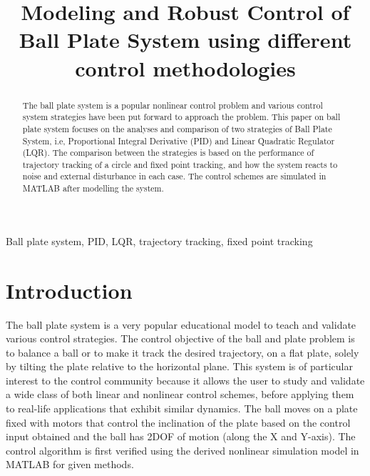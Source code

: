 \documentclass[conference]{IEEEtran}
\begin{document}
\title{Modeling and Robust Control of Ball Plate System using different control methodologies\\
}

\author{
\and
{}
}
\maketitle

\begin{abstract}
The ball plate system is a popular nonlinear control problem and various control system strategies have been put forward to approach the problem. This paper on ball plate system focuses on the analyses and comparison of two strategies of Ball Plate System, i.e, Proportional Integral Derivative (PID) and Linear Quadratic Regulator (LQR). The comparison between the strategies is based on the performance of trajectory tracking of a circle and fixed point tracking, and how the system reacts to noise and external disturbance in each case. The control schemes are simulated in MATLAB after modelling the system.
\end{abstract}

\begin{IEEEkeywords}
Ball plate system, PID, LQR, trajectory tracking, fixed point tracking
\end{IEEEkeywords}

\section{Introduction}
The ball plate system is a very popular educational model to teach and validate various control strategies. The control objective of the ball and plate problem is to balance a ball or to make it track the desired trajectory, on a flat plate, solely by tilting the plate relative to the horizontal plane. This system is of particular interest to the control community because it allows the user to study and validate a wide class of both linear and nonlinear control schemes, before applying them to real-life applications that exhibit similar dynamics. The ball moves on a plate fixed with motors that control the inclination of the plate based on the control input obtained and the ball has 2DOF of motion (along the X and Y-axis). The control algorithm is first verified using the derived nonlinear simulation model in MATLAB for given methods.
\end{document}
